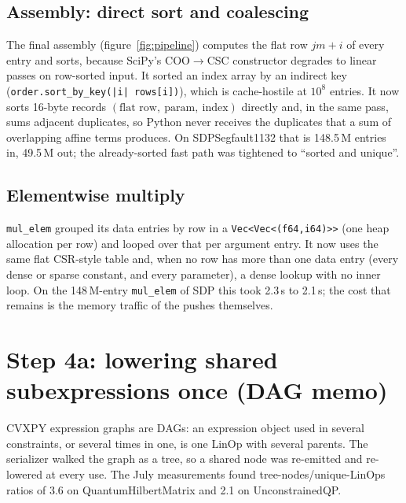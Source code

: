 \documentclass[11pt,a4paper]{article}
\newcommand{\code}[1]{\texttt{#1}}
\begin{document}
\subsection{Assembly: direct sort and coalescing}

The final assembly (figure~\ref{fig:pipeline}) computes the flat row $jm+i$ of every entry and sorts,
because SciPy's COO$\to$CSC constructor degrades to linear passes on row-sorted input. It sorted an
index array by an indirect key (\code{order.sort\_by\_key(|i| rows[i])}), which is cache-hostile at
$10^8$ entries. It now sorts 16-byte records $(\text{flat row},\ \text{param},\ \text{index})$ directly
and, in the same pass, sums adjacent duplicates, so Python never receives the duplicates that a sum of
overlapping affine terms produces. On SDPSegfault1132 that is 148.5\,M entries in, 49.5\,M out; the
already-sorted fast path was tightened to ``sorted and unique''.

\subsection{Elementwise multiply}

\code{mul\_elem} grouped its data entries by row in a \code{Vec<Vec<(f64,i64)>>} (one heap
allocation per row) and looped over that per argument entry. It now uses the same flat CSR-style table
and, when no row has more than one data entry (every dense or sparse constant, and every parameter),
a dense lookup with no inner loop. On the 148\,M-entry \code{mul\_elem} of SDP this took 2.3\,s to
2.1\,s; the cost that remains is the memory traffic of the pushes themselves.

\section{Step 4a: lowering shared subexpressions once (DAG memo)}
\label{sec:memo}

CVXPY expression graphs are DAGs: an expression object used in several constraints, or several times
in one, is one LinOp with several parents. The serializer walked the graph as a tree, so a shared node
was re-emitted and re-lowered at every use. The July measurements found tree-nodes/unique-LinOps ratios
of 3.6 on QuantumHilbertMatrix and 2.1 on UnconstrainedQP.
\end{document}
